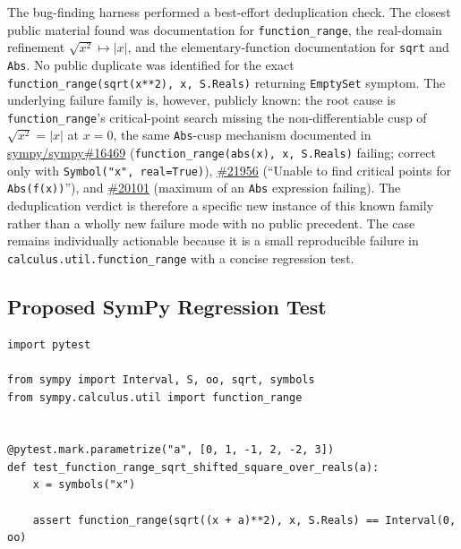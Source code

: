 \documentclass[11pt]{article}
\begin{document}
The bug-finding harness performed a best-effort deduplication check. The closest
public material found was documentation for \texttt{function\_range}, the
real-domain refinement \(\sqrt{x^2}\mapsto |x|\), and the elementary-function
documentation for \texttt{sqrt} and \texttt{Abs}. No public duplicate was
identified for the exact \texttt{function\_range(sqrt(x**2), x, S.Reals)}
returning \texttt{EmptySet} symptom. The underlying failure family is, however,
publicly known: the root cause is \texttt{function\_range}'s critical-point
search missing the non-differentiable cusp of \(\sqrt{x^2}=|x|\) at \(x=0\), the
same \texttt{Abs}-cusp mechanism documented in
\href{https://github.com/sympy/sympy/issues/16469}{sympy/sympy\#16469}
(\texttt{function\_range(abs(x), x, S.Reals)} failing; correct only with
\texttt{Symbol("x", real=True)}),
\href{https://github.com/sympy/sympy/issues/21956}{\#21956}
(``Unable to find critical points for \texttt{Abs(f(x))}''), and
\href{https://github.com/sympy/sympy/issues/20101}{\#20101} (maximum of an
\texttt{Abs} expression failing). The deduplication verdict is therefore a
specific new instance of this known family rather than a wholly new failure mode
with no public precedent. The case remains individually actionable because it is
a small reproducible failure in \texttt{calculus.util.function\_range} with a
concise regression test.

\subsection{Proposed SymPy Regression Test}

\medskip

\begin{lstlisting}[style=bugpython]
import pytest

from sympy import Interval, S, oo, sqrt, symbols
from sympy.calculus.util import function_range


@pytest.mark.parametrize("a", [0, 1, -1, 2, -2, 3])
def test_function_range_sqrt_shifted_square_over_reals(a):
    x = symbols("x")

    assert function_range(sqrt((x + a)**2), x, S.Reals) == Interval(0, oo)
\end{lstlisting}
\end{document}
